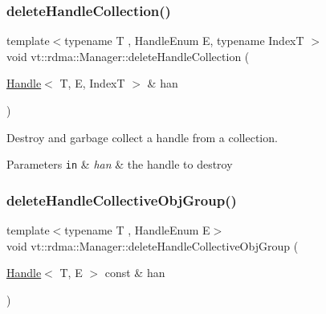 \mbox{\label{structvt_1_1rdma_1_1_manager_a3a1f982e986d58e91837a2b1aa048468}} 
\subsubsection{\texorpdfstring{delete\+Handle\+Collection()}{deleteHandleCollection()}}
{\footnotesize\ttfamily template$<$typename T , Handle\+Enum E, typename IndexT $>$ \\
void vt\+::rdma\+::\+Manager\+::delete\+Handle\+Collection (\begin{DoxyParamCaption}\item[{\hyperlink{structvt_1_1rdma_1_1_handle}{Handle}$<$ T, E, IndexT $>$ \&}]{han }\end{DoxyParamCaption})}



Destroy and garbage collect a handle from a collection. 


\begin{DoxyParams}[1]{Parameters}
\mbox{\tt in}  & {\em han} & the handle to destroy \\
\hline
\end{DoxyParams}
\mbox{\label{structvt_1_1rdma_1_1_manager_a4219310feca011fd242e654c9ba51280}} 
\subsubsection{\texorpdfstring{delete\+Handle\+Collective\+Obj\+Group()}{deleteHandleCollectiveObjGroup()}}
{\footnotesize\ttfamily template$<$typename T , Handle\+Enum E$>$ \\
void vt\+::rdma\+::\+Manager\+::delete\+Handle\+Collective\+Obj\+Group (\begin{DoxyParamCaption}\item[{\hyperlink{structvt_1_1rdma_1_1_handle}{Handle}$<$ T, E $>$ const \&}]{han }\end{DoxyParamCaption})}



